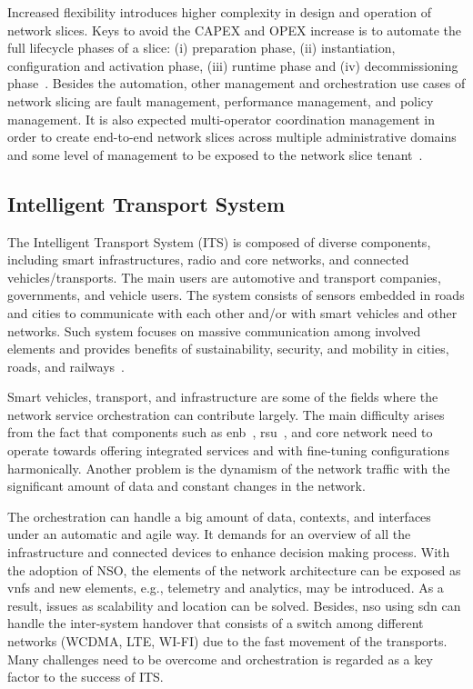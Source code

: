 Increased flexibility introduces higher complexity in design and operation of network slices. Keys to avoid the CAPEX and OPEX increase is to automate the full lifecycle phases of a slice: (i) preparation phase, (ii) instantiation, configuration and activation phase, (iii) runtime phase and (iv) decommissioning phase~\cite{3GPP:TR28801:2017}. Besides the automation, other management and orchestration use cases of network slicing are fault management, performance management, and policy management. It is also expected multi-operator coordination management in order to create end-to-end network slices across multiple administrative domains and some level of management to be exposed to the network slice tenant~\cite{Contreras:2018}.

\subsection{Intelligent Transport System}

The Intelligent Transport System (ITS) is composed of diverse components, including smart infrastructures, radio and core networks, and connected vehicles/transports. The main users are automotive and transport companies, governments, and vehicle users. The system consists of sensors embedded in roads and cities to communicate with each other and/or with smart vehicles and other networks. Such system focuses on massive communication among involved elements and provides benefits of sustainability, security, and mobility in cities, roads, and railways~\cite{EricssonInc.2015}.

Smart vehicles, transport, and infrastructure are some of the fields where the network service orchestration can contribute largely. The main difficulty arises from the fact that components such as \gls{enb}~\cite{5600764}, \gls{rsu}~\cite{8253971}, and core network need to operate towards offering integrated services and with fine-tuning configurations harmonically. Another problem is the dynamism of the network traffic with the significant amount of data and constant changes in the network.

The orchestration can handle a big amount of data, contexts, and interfaces under an automatic and agile way. It demands for an overview of all the infrastructure and connected devices to enhance decision making process. With the adoption of NSO, the elements of the network architecture can be exposed as \glspl{vnf} and new elements, e.g., telemetry and analytics, may be introduced. As a result, issues as scalability and location can be solved. Besides, \gls{nso} using \gls{sdn} can handle the inter-system handover that consists of a switch among different networks (WCDMA, LTE, WI-FI) due to the fast movement of the transports. Many challenges need to be overcome and  orchestration is regarded as a key factor to the success of ITS.

